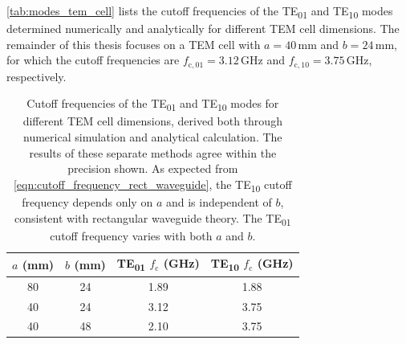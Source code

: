 \autoref{tab:modes_tem_cell} lists the cutoff frequencies of the TE\textsubscript{01} and TE\textsubscript{10} modes determined numerically and analytically for different TEM cell dimensions. The remainder of this thesis focuses on a TEM cell with $a=40\,\mathrm{mm}$ and $b=24\,\mathrm{mm}$, for which the cutoff frequencies are $f_\mathrm{c,01}=3.12\,\mathrm{GHz}$ and $f_\mathrm{c,10}=3.75\,\mathrm{GHz}$, respectively.
\begin{table}[h]
	\centering
	\begin{tabular}{|c|c||c|c|}
		\hline
		$a$ (mm) & $b$ (mm) & TE\textsubscript{01} $f_\mathrm{c}$ (GHz) & TE\textsubscript{10} $f_\mathrm{c}$ (GHz)\\
		\hline
		80 & 24 & 1.89 & 1.88 \\
		\hline
		40 & 24 & 3.12 & 3.75 \\
		\hline
		40 & 48 & 2.10 & 3.75 \\
		\hline
	\end{tabular}
	\caption{Cutoff frequencies of the TE\textsubscript{01} and TE\textsubscript{10} 
		modes for different TEM cell dimensions, derived both through numerical simulation and analytical calculation. The results of these separate methods agree within the precision shown. As expected from 
		\eqref{eqn:cutoff_frequency_rect_waveguide}, the TE\textsubscript{10} cutoff 
		frequency depends only on $a$ and is independent of $b$, consistent with rectangular waveguide theory. The TE\textsubscript{01} cutoff frequency varies with both $a$ and $b$.}
	\label{tab:modes_tem_cell}
\end{table}


